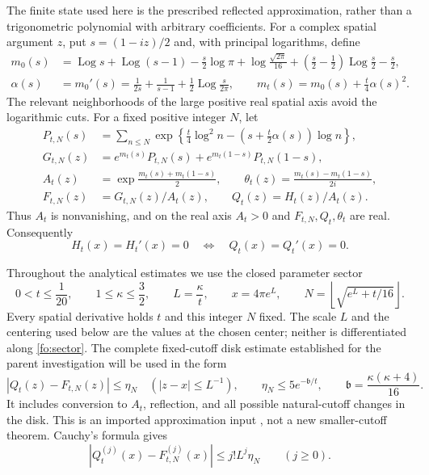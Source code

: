 \documentclass[11pt]{article}
\numberwithin{equation}{section}
\theoremstyle{definition}
\theoremstyle{remark}
\DeclareMathOperator{\Log}{Log}
\begin{document}
The finite state used here is the prescribed reflected approximation,
rather than a trigonometric polynomial with arbitrary coefficients.
For a complex spatial argument $z$, put $s=(1-iz)/2$ and, with
principal logarithms, define
\begin{align}
m_0(s)&=\Log s+\Log(s-1)-\frac{s}{2}\log\pi
 +\log\frac{\sqrt{2\pi}}{16}
 +\left(\frac{s}{2}-\frac12\right)\Log\frac{s}{2}-\frac{s}{2},
 \label{fo:m0}\\
\alpha(s)&=m_0'(s)=\frac1{2s}+\frac1{s-1}
 +\frac12\Log\frac{s}{2\pi},\qquad
m_t(s)=m_0(s)+\frac{t}{4}\alpha(s)^2.\nonumber
\end{align}
The relevant neighborhoods of the large positive real spatial axis
avoid the logarithmic cuts.  For a fixed positive integer $N$, let
\begin{align}
P_{t,N}(s)&=\sum_{n\le N}
 \exp\left\{\frac{t}{4}\log^2 n
       -\left(s+\frac{t}{2}\alpha(s)\right)\log n\right\},
 \label{fo:approximation}\\
G_{t,N}(z)&=e^{m_t(s)}P_{t,N}(s)
           +e^{m_t(1-s)}P_{t,N}(1-s),\nonumber\\
A_t(z)&=\exp\frac{m_t(s)+m_t(1-s)}2,\qquad
\theta_t(z)=\frac{m_t(s)-m_t(1-s)}{2i},\nonumber\\
F_{t,N}(z)&=G_{t,N}(z)/A_t(z),
 \qquad Q_t(z)=H_t(z)/A_t(z).\nonumber
\end{align}
Thus $A_t$ is nonvanishing, and on the real axis $A_t>0$ and
$F_{t,N},Q_t,\theta_t$ are real.  Consequently
\begin{equation}
H_t(x)=H_t'(x)=0\quad\Longleftrightarrow\quad
Q_t(x)=Q_t'(x)=0.
\label{fo:collision-equivalence}
\end{equation}

Throughout the analytical estimates we use the closed parameter sector
\begin{equation}
0<t\le\frac1{20},\qquad 1\le\kappa\le\frac32,\qquad
L=\frac{\kappa}{t},\qquad x=4\pi e^L,\qquad
N=\left\lfloor\sqrt{e^L+t/16}\right\rfloor.
\label{fo:sector}
\end{equation}
Every spatial derivative holds $t$ and this integer $N$ fixed.
The scale $L$ and the centering used below are the values at the chosen
center; neither is differentiated along \eqref{fo:sector}.
The complete fixed-cutoff disk estimate established for the parent
investigation will be used in the form
\begin{equation}
\left|Q_t(z)-F_{t,N}(z)\right|\le\eta_N
 \quad (|z-x|\le L^{-1}),\qquad
\eta_N\le5e^{-\mathfrak b/t},\qquad
\mathfrak b=\frac{\kappa(\kappa+4)}{16}.
\label{fo:disk-input}
\end{equation}
It includes conversion to $A_t$, reflection, and all possible
natural-cutoff changes in the disk.  This is an imported approximation
input \cite{polymath,heatnotes}, not a new smaller-cutoff theorem.
Cauchy's formula gives
\begin{equation}
\left|Q_t^{(j)}(x)-F_{t,N}^{(j)}(x)\right|
 \le j!L^j\eta_N\qquad(j\ge0).
\label{fo:cauchy}
\end{equation}
\end{document}
